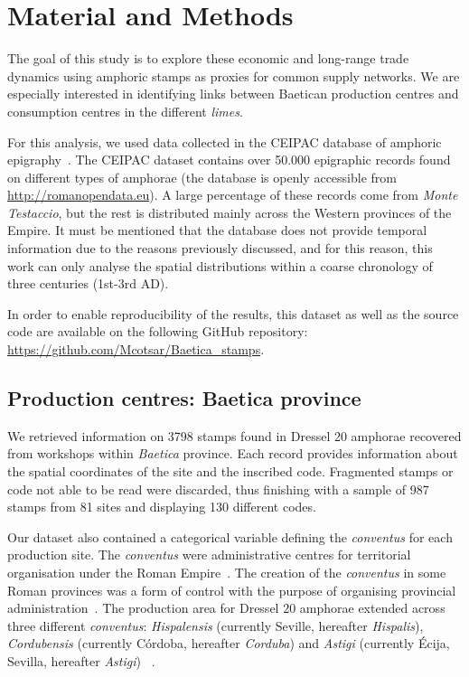 \section{Material and Methods}
\label{sec:5}

The goal of this study is to explore these economic and long-range trade dynamics using amphoric stamps as proxies for common supply networks. We are especially interested in identifying links between Baetican production centres and consumption centres in the different \textit{limes}. 

For this analysis, we used data collected in the CEIPAC database of amphoric epigraphy~\citep{remesal_centro_2015}. The CEIPAC dataset contains over 50.000 epigraphic records found on different types of amphorae (the database is openly accessible from \url{http://romanopendata.eu}). A large percentage of these records come from \textit{Monte Testaccio}, but the rest is distributed mainly across the Western provinces of the Empire. It must be mentioned that the database does not provide temporal information due to the reasons previously discussed, and for this reason, this work can only analyse the spatial distributions within a coarse chronology of three centuries (1st-3rd AD).

In order to enable reproducibility of the results, this dataset as well as the source code are available on the following GitHub repository: \url{https://github.com/Mcotsar/Baetica\_stamps}.

\subsection{Production centres: Baetica province}
\label{sec:5}

We retrieved information on 3798 stamps found in Dressel 20 amphorae recovered from workshops within \textit{Baetica} province. Each record provides information about the spatial coordinates of the site and the inscribed code. Fragmented stamps or code not able to be read were discarded, thus finishing with a sample of 987 stamps from 81 sites and displaying 130 different codes. 

Our dataset also contained a categorical variable defining the \textit{conventus} for each production site. The \textit{conventus} were administrative centres for territorial organisation under the Roman Empire~\citep[58]{ozcariz_gil_administracion_2013}. The creation of the \textit{conventus} in some Roman provinces was a form of control with the purpose of organising provincial administration~\citep{albertini_les_1923}. The production area for Dressel 20 amphorae extended across three different \textit{conventus}: \textit{Hispalensis} (currently Seville, hereafter \textit{Hispalis}), \textit{Cordubensis} (currently C\'ordoba, hereafter \textit{Corduba}) and \textit{Astigi} (currently \'Ecija, Sevilla, hereafter \textit{Astigi})~\citep{rodriguez_economioleicola_1977,chicdatos2001,berni_millet_epigrafianforica_2008} . 

